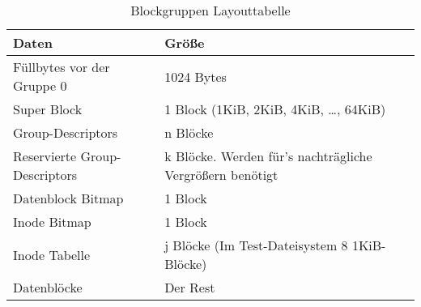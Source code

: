 \documentclass[11pt,a4paper]{article}
\begin{document}
\begin{table}[h]
	\begin{center}
		\begin{tabular}[c]{| l | l |}
			\hline
			\cellcolor{grey} Daten & \cellcolor{grey} Größe \\ \hline
			Füllbytes vor der Gruppe 0 & 1024 Bytes \\ \hline
			Super Block & 1 Block (1KiB, 2KiB, 4KiB, \ldots, 64KiB) \\ \hline
			Group-Descriptors & n Blöcke  \\ \hline
			Reservierte Group-Descriptors & k Blöcke. Werden für's nachträgliche Vergrößern benötigt \\ \hline
			Datenblock Bitmap & 1 Block \\ \hline
			Inode Bitmap & 1 Block \\ \hline
			Inode Tabelle & j Blöcke (Im Test-Dateisystem 8 1KiB-Blöcke) \\ \hline
			Datenblöcke & Der Rest \\ \hline
		
		\end{tabular}
	\end{center}

	\caption{Blockgruppen Layouttabelle}
	\label{tab:block_layout}
\end{table}
\end{document}

